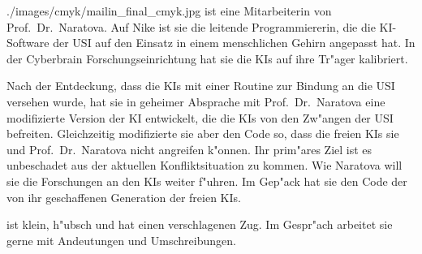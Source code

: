\newsection[Mailin]{\ml{}}

\begin{sideimagebox}[r]{0.6}{./images/cmyk/mailin_final_cmyk.jpg}{\ml}
    \ml{} ist eine Mitarbeiterin von Prof.~Dr.~Naratova. Auf Nike ist sie die leitende Programmiererin, die die KI-Software der USI auf den Einsatz in einem menschlichen Gehirn angepasst hat. In der Cyberbrain Forschungseinrichtung hat sie die KIs auf ihre Tr"ager kalibriert.

    Nach der Entdeckung, dass die KIs mit einer Routine zur Bindung an die USI versehen wurde, hat sie in geheimer Absprache mit Prof.~Dr.~Naratova eine modifizierte Version der KI entwickelt, die die KIs von den Zw"angen der USI befreiten. Gleichzeitig modifizierte sie aber den Code so, dass die freien KIs sie und Prof.~Dr.~Naratova nicht angreifen k"onnen. Ihr prim"ares Ziel ist es unbeschadet aus der aktuellen Konfliktsituation zu kommen. Wie Naratova will sie die Forschungen an den KIs weiter f"uhren. Im Gep"ack hat sie den Code der von ihr geschaffenen Generation der freien KIs.

    \ml{} ist klein, h"ubsch und hat einen verschlagenen Zug. Im Gespr"ach arbeitet sie gerne mit Andeutungen und Umschreibungen.
\end{sideimagebox}
